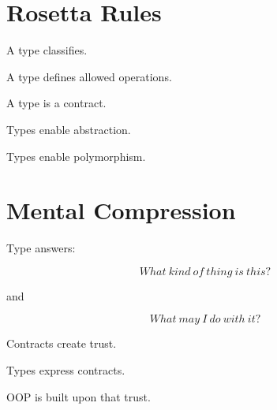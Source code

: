 \documentclass[11pt,a4paper]{book}
\begin{document}

\section{Rosetta Rules}

\begin{rosettarule}

A type classifies.

\end{rosettarule}

\begin{rosettarule}

A type defines allowed operations.

\end{rosettarule}

\begin{rosettarule}

A type is a contract.

\end{rosettarule}

\begin{rosettarule}

Types enable abstraction.

\end{rosettarule}

\begin{rosettarule}

Types enable polymorphism.

\end{rosettarule}


\section{Mental Compression}

Type answers:

\[
What\ kind\ of\ thing\ is\ this?
\]

and

\[
What\ may\ I\ do\ with\ it?
\]


Contracts create trust.

Types express contracts.

OOP is built upon that trust.

\end{document}
